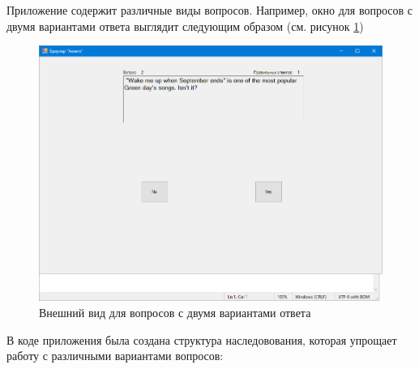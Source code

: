 Приложение содержит различные виды вопросов. Например, окно для вопросов с двумя вариантами
ответа выглядит следующим образом (см. рисунок \ref{fig:yesorno})
\begin{figure}[H]
    \includegraphics[scale=0.6]{task9/yesorno.png}
	\caption{Внешний вид для вопросов с двумя вариантами ответа}
	\label{fig:yesorno}
\end{figure}
В коде приложения была создана структура наследовования, которая
упрощает работу с различными вариантами вопросов:
